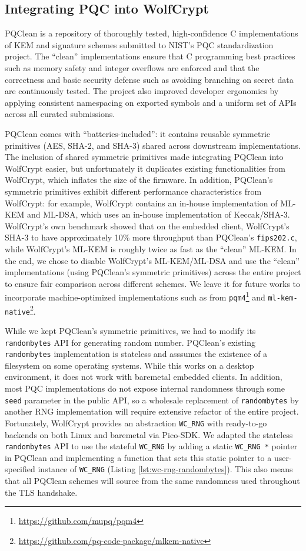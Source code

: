 \documentclass[letterpaper,12pt,titlepage,oneside,final]{book}
\begin{document}
\subsection{Integrating PQC into WolfCrypt}\label{sec:integrating-pqc-wolfcrypt}
PQClean is a repository of thoroughly tested, high-confidence C implementations of KEM and signature schemes submitted to NIST's PQC standardization project.
The ``clean'' implementations ensure that C programming best practices such as memory safety and integer overflows are enforced and that the correctness and basic security defense such as avoiding branching on secret data are continuously tested.
The project also improved developer ergonomics by applying consistent namespacing on exported symbols and a uniform set of APIs across all curated submissions.

PQClean comes with ``batteries-included'': it contains reusable symmetric primitives (AES, SHA-2, and SHA-3) shared across downstream implementations.
The inclusion of shared symmetric primitives made integrating PQClean into WolfCrypt easier, but unfortunately it duplicates existing functionalities from WolfCrypt, which inflates the size of the firmware.
In addition, PQClean's symmetric primitives exhibit different performance characteristics from WolfCrypt: for example, WolfCrypt contains an in-house implementation of ML-KEM and ML-DSA, which uses an in-house implementation of Keccak/SHA-3.
WolfCrypt's own benchmark showed that on the embedded client, WolfCrypt's SHA-3 to have approximately 10\% more throughput than PQClean's \texttt{fips202.c}, while WolfCrypt's ML-KEM is roughly twice as fast as the ``clean'' ML-KEM.
In the end, we chose to disable WolfCrypt's ML-KEM/ML-DSA and use the ``clean'' implementations (using PQClean's symmetric primitives) across the entire project to ensure fair comparison across different schemes. 
We leave it for future works to incorporate machine-optimized implementations such as from \texttt{pqm4}\footnote{\scriptsize \url{https://github.com/mupq/pqm4}} and \texttt{ml-kem-native}\footnote{\scriptsize \url{https://github.com/pq-code-package/mlkem-native}}.

While we kept PQClean's symmetric primitives, we had to modify its \texttt{randombytes} API for generating random number.
PQClean's existing \texttt{randombytes} implementation is stateless and asssumes the existence of a filesystem on some operating systems.
While this works on a desktop environment, it does not work with baremetal embedded clients.
In addition, most PQC implementations do not expose internal randomness through some \texttt{seed} parameter in the public API, so a wholesale replacement of \texttt{randombytes} by another RNG implementation will require extensive refactor of the entire project.
Fortunately, WolfCrypt provides an abstraction \texttt{WC\_RNG} with ready-to-go backends on both Linux and baremetal via Pico-SDK.
We adapted the stateless \texttt{randombytes} API to use the stateful \texttt{WC\_RNG} by adding a static \texttt{WC\_RNG *} pointer in PQClean and implementing a function that sets this static pointer to a user-specified instance of \texttt{WC\_RNG} (Listing \ref{lst:wc-rng-randombytes}).
This also means that all PQClean schemes will source from the same randomness used throughout the TLS handshake.
\end{document}

